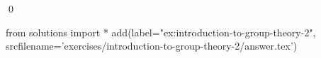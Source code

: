 
    \begin{ex}
  \label{ex:introduction-to-group-theory-2}
  
  \qed
\end{ex}
\begin{python0}
from solutions import *
add(label="ex:introduction-to-group-theory-2",
    srcfilename='exercises/introduction-to-group-theory-2/answer.tex') 
\end{python0}                              
